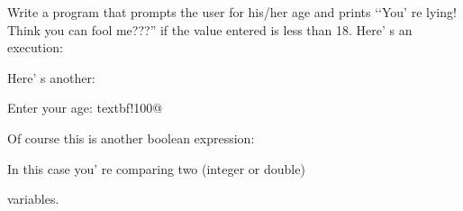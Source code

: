 Write a program that prompts the user for his/her age and prints \lq\lq You' re lying! Think you can fool me???'' if the value entered is less than 18. Here' s an execution:


Here' s another:



\begin{console}[commandchars=\~\!\@]

Enter your age: textbf!100@

\end{console}

Of course this is another boolean expression:

\begin{center}

\EMPHASIZE{[var1] [bool op] [var2]}

\end{center}

In this case you' re comparing two (integer or double)

variables.

